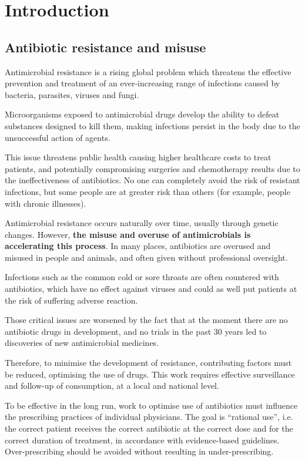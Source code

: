 \chapter{Introduction}
\section{Antibiotic resistance and misuse}
Antimicrobial resistance is a rising global problem which threatens the effective prevention and treatment of an ever-increasing range of infections caused by bacteria, parasites, viruses and fungi\cite{who}. 

Microorganisms exposed to antimicrobial drugs develop the ability to defeat substances designed to kill them, making infections persist in the body due to the unsuccessful action of agents.

This issue threatens public health causing higher healthcare costs to treat patients, and potentially compromising surgeries and chemotherapy results due to the ineffectiveness of antibiotics. No one can completely avoid the risk of resistant infections, but some people are at greater risk than others (for example, people with chronic illnesses)\cite{cdc}.

Antimicrobial resistance occurs naturally over time, usually through genetic changes. However, \textbf{the misuse and overuse of antimicrobials is accelerating this process}. In many places, antibiotics are overused and misused in people and animals, and often given without professional oversight\cite{who}.

Infections such as the common cold or sore throats are often countered with antibiotics, which have no effect against viruses and could as well put patients at the risk of suffering adverse reaction\cite{bmj}.

Those critical issues are worsened by the fact that at the moment there are no antibiotic drugs in development, and no trials in the past 30 years led to discoveries of new antimicrobial medicines\cite{agenziafarmaco}. 

Therefore, to minimise the development of resistance, contributing factors must be reduced, optimising the use of drugs. This work requires effective surveillance and follow-up of consumption, at a local and national level. 

To be effective in the long run, work to optimise use of antibiotics must influence the prescribing practices of individual physicians. The goal is “rational use”, i.e. the correct patient receives the correct antibiotic at the correct dose and for the correct duration of treatment, in accordance with evidence-based guidelines. Over-prescribing should be avoided without resulting in under-prescribing\cite{sweden}.

